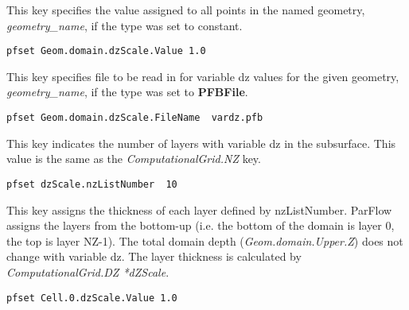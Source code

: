{
This key specifies the value assigned to all points in the named
geometry, {\em geometry\_name}, if the type was set to constant.
}
\begin{display}\begin{verbatim}
pfset Geom.domain.dzScale.Value 1.0
\end{verbatim}\end{display}

{
This key specifies file to be read in for variable dz values for the given 
geometry, {\em geometry\_name}, if the type was set to {\bf PFBFile}.
}
\begin{display}\begin{verbatim}
pfset Geom.domain.dzScale.FileName  vardz.pfb
\end{verbatim}\end{display}

{
This key indicates the number of layers with variable dz in the subsurface.
This value is the same as the \emph{ComputationalGrid.NZ} key.
}
\begin{display}\begin{verbatim}
pfset dzScale.nzListNumber  10
\end{verbatim}\end{display}


{
This key assigns the thickness of each layer defined by nzListNumber.
ParFlow assigns the layers from the bottom-up (i.e. the bottom 
of the domain is layer 0, the top is layer NZ-1). The total domain depth
(\emph{Geom.domain.Upper.Z}) does not change with variable dz. The layer thickness
is calculated by \emph{ComputationalGrid.DZ *dZScale}.
}
\begin{display}\begin{verbatim}
pfset Cell.0.dzScale.Value 1.0
\end{verbatim}\end{display}

